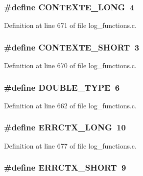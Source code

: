 \subsubsection[{CONTEXTE\_\-LONG}]{\setlength{\rightskip}{0pt plus 5cm}\#define CONTEXTE\_\-LONG~4}\label{log__functions_8c_a09270d6c67de48fb5593fcbee2e9d055}


Definition at line 671 of file log\_\-functions.c.
\subsubsection[{CONTEXTE\_\-SHORT}]{\setlength{\rightskip}{0pt plus 5cm}\#define CONTEXTE\_\-SHORT~3}\label{log__functions_8c_a5837388f570012f92e2198cd3ea92a92}


Definition at line 670 of file log\_\-functions.c.
\subsubsection[{DOUBLE\_\-TYPE}]{\setlength{\rightskip}{0pt plus 5cm}\#define DOUBLE\_\-TYPE~6}\label{log__functions_8c_a77691fa5b017b6f6e932224ffc952fe5}


Definition at line 662 of file log\_\-functions.c.
\subsubsection[{ERRCTX\_\-LONG}]{\setlength{\rightskip}{0pt plus 5cm}\#define ERRCTX\_\-LONG~10}\label{log__functions_8c_ae2d9a44c3fe0f58f0f394d1b3f357b13}


Definition at line 677 of file log\_\-functions.c.
\subsubsection[{ERRCTX\_\-SHORT}]{\setlength{\rightskip}{0pt plus 5cm}\#define ERRCTX\_\-SHORT~9}\label{log__functions_8c_a4098e0167ffc21728f7360375f314b8a}


